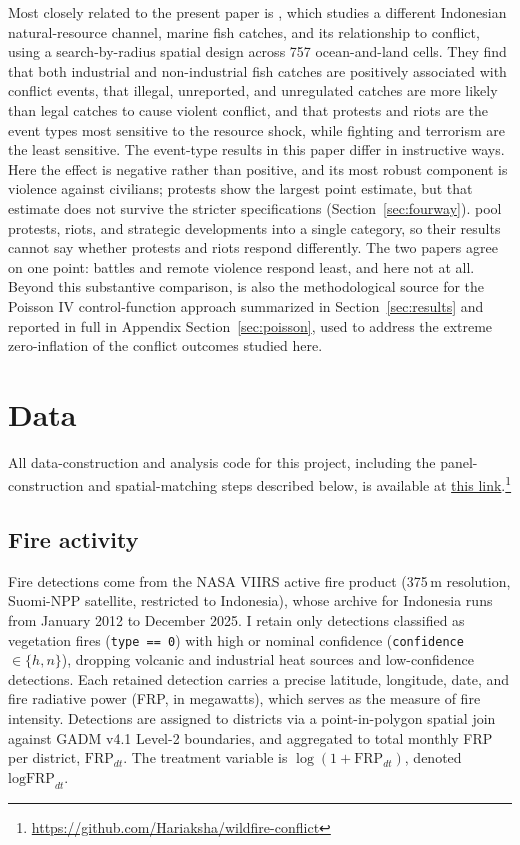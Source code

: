 \documentclass[12pt]{article}
\begin{document}
Most closely related to the present paper is \citet{lu2023fish}, which studies a different Indonesian natural-resource channel, marine fish catches, and its relationship to conflict, using a search-by-radius spatial design across 757 ocean-and-land cells. They find that both industrial and non-industrial fish catches are positively associated with conflict events, that illegal, unreported, and unregulated catches are more likely than legal catches to cause violent conflict, and that protests and riots are the event types most sensitive to the resource shock, while fighting and terrorism are the least sensitive. The event-type results in this paper differ in instructive ways. Here the effect is negative rather than positive, and its most robust component is violence against civilians; protests show the largest point estimate, but that estimate does not survive the stricter specifications (Section~\ref{sec:fourway}). \citet{lu2023fish} pool protests, riots, and strategic developments into a single category, so their results cannot say whether protests and riots respond differently. The two papers agree on one point: battles and remote violence respond least, and here not at all. Beyond this substantive comparison, \citet{lu2023fish} is also the methodological source for the Poisson IV control-function approach summarized in Section~\ref{sec:results} and reported in full in Appendix Section~\ref{sec:poisson}, used to address the extreme zero-inflation of the conflict outcomes studied here.

\section{Data}
\label{sec:data}

All data-construction and analysis code for this project, including the panel-construction and spatial-matching steps described below, is available at \href{https://github.com/Hariaksha/wildfire-conflict}{this link}.\footnote{\url{https://github.com/Hariaksha/wildfire-conflict}}

\subsection{Fire activity}

Fire detections come from the NASA VIIRS active fire product (375\,m resolution, Suomi-NPP satellite, restricted to Indonesia), whose archive for Indonesia runs from January 2012 to December 2025. I retain only detections classified as vegetation fires (\texttt{type == 0}) with high or nominal confidence (\texttt{confidence} $\in \{h, n\}$), dropping volcanic and industrial heat sources and low-confidence detections. Each retained detection carries a precise latitude, longitude, date, and fire radiative power (FRP, in megawatts), which serves as the measure of fire intensity. Detections are assigned to districts via a point-in-polygon spatial join against GADM v4.1 Level-2 boundaries, and aggregated to total monthly FRP per district, $\text{FRP}_{dt}$. The treatment variable is $\log(1+\text{FRP}_{dt})$, denoted $\text{logFRP}_{dt}$.
\end{document}
